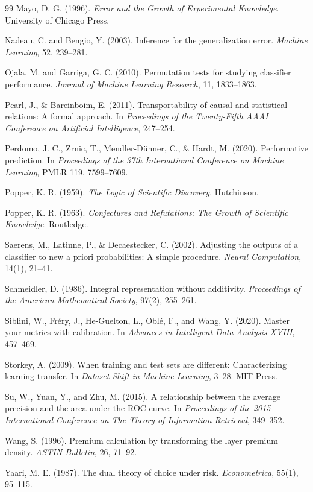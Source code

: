 \documentclass[11pt]{article}
\theoremstyle{remark}
\begin{document}
\begin{thebibliography}{99}
Mayo, D. G. (1996).
\emph{Error and the Growth of Experimental Knowledge}.
University of Chicago Press.

Nadeau, C. and Bengio, Y. (2003).
Inference for the generalization error.
\emph{Machine Learning}, 52, 239--281.

Ojala, M. and Garriga, G. C. (2010).
Permutation tests for studying classifier performance.
\emph{Journal of Machine Learning Research}, 11, 1833--1863.

Pearl, J., \& Bareinboim, E. (2011).
Transportability of causal and statistical relations: A formal approach.
In \emph{Proceedings of the Twenty-Fifth AAAI Conference on Artificial Intelligence}, 247--254.

Perdomo, J. C., Zrnic, T., Mendler-D\"unner, C., \& Hardt, M. (2020).
Performative prediction.
In \emph{Proceedings of the 37th International Conference on Machine Learning}, PMLR 119, 7599--7609.

Popper, K. R. (1959).
\emph{The Logic of Scientific Discovery}.
Hutchinson.

Popper, K. R. (1963).
\emph{Conjectures and Refutations: The Growth of Scientific Knowledge}.
Routledge.

Saerens, M., Latinne, P., \& Decaestecker, C. (2002).
Adjusting the outputs of a classifier to new a priori probabilities: A simple procedure.
\emph{Neural Computation}, 14(1), 21--41.

Schmeidler, D. (1986).
Integral representation without additivity.
\emph{Proceedings of the American Mathematical Society}, 97(2), 255--261.

Siblini, W., Fr\'ery, J., He-Guelton, L., Obl\'e, F., and Wang, Y. (2020).
Master your metrics with calibration.
In \emph{Advances in Intelligent Data Analysis XVIII}, 457--469.

Storkey, A. (2009).
When training and test sets are different: Characterizing learning transfer.
In \emph{Dataset Shift in Machine Learning}, 3--28. MIT Press.

Su, W., Yuan, Y., and Zhu, M. (2015).
A relationship between the average precision and the area under the ROC curve.
In \emph{Proceedings of the 2015 International Conference on The Theory of Information Retrieval}, 349--352.

Wang, S. (1996).
Premium calculation by transforming the layer premium density.
\emph{ASTIN Bulletin}, 26, 71--92.

Yaari, M. E. (1987).
The dual theory of choice under risk.
\emph{Econometrica}, 55(1), 95--115.

\end{thebibliography}
\end{document}

